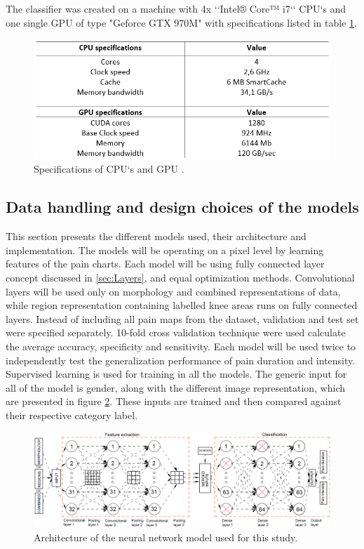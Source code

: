 \noindent
The classifier was created on a machine with 4x ‘‘Intel® Core™ i7‘‘ CPU‘s and one single GPU of type "Geforce GTX 970M" with specifications listed in table \ref{fig:Specs}.

\begin{figure} [H]
\centering
\includegraphics[width=1\textwidth]{figures/Specs}
\caption{Specifications of CPU‘s and GPU \citep{Intel,Nvidia}.}
\label{fig:Specs}
\end{figure}

\subsection{Data handling and design choices of the models}
This section presents the different models used, their architecture and implementation.
The models will be operating on a pixel level by learning features of the pain charts.
Each model will be using fully connected layer concept discussed in \autoref{sec:Layers}, and equal optimization methods. Convolutional layers will be used only on morphology and combined representations of data, while region representation containing labelled knee areas runs on fully connected layers.
Instead of including all pain maps from the dataset, validation and test set were specified separately. 10-fold cross validation technique were used calculate the average accuracy, specificity and sensitivity. Each model will be used twice to independently test the generalization performance of pain duration and intensity. Supervised learning is used for training in all the models. The generic input for all of the model is gender, along with the different image representation, which are presented in figure \ref{fig:Schema1}. These inputs are trained and then compared against their respective category label. 

\begin{figure} [H]
\centering
\includegraphics[width=1.0\textwidth]{figures/Schema1}
\caption{Architecture of the neural network model used for this study.}
\label{fig:Schema1} 
\end{figure}

